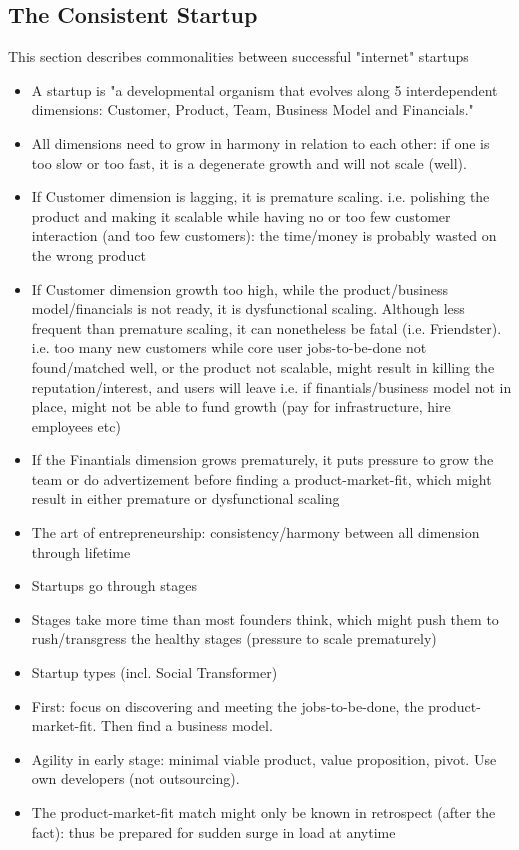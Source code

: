 \documentclass[a4paper,10pt]{article}
\begin{document}
\subsection{The Consistent Startup}
This section describes commonalities between successful "internet" startups
\begin{itemize}
  \item A startup is "a developmental organism that evolves along 5 interdependent dimensions: Customer, Product, Team, Business Model and Financials." \cite{genomePrematureScalingReport}
  \item All dimensions need to grow in harmony in relation to each other: if one is too slow or too fast, it is a degenerate growth and will not scale (well).
  \item If Customer dimension is lagging, it is premature scaling. 
  \subitem i.e. polishing the product and making it scalable while having no or too few customer interaction (and too few customers): the time/money is probably wasted on the wrong product
  \item If Customer dimension growth too high, while the product/business model/financials is not ready, it is dysfunctional scaling. 
	Although less frequent than premature scaling, it can nonetheless be fatal (i.e. Friendster).
  \subitem i.e. too many new customers while core user jobs-to-be-done not found/matched well, or the product not scalable, might result in killing the reputation/interest, and users will leave
  \subitem i.e. if finantials/business model not in place, might not be able to fund growth (pay for infrastructure, hire employees etc) 
  \item If the Finantials dimension grows prematurely, it puts pressure to grow the team or do advertizement before finding a product-market-fit, 
	which might result in either premature or dysfunctional scaling
  \item The art of entrepreneurship: consistency/harmony between all dimension through lifetime
  \item Startups go through stages
  \item Stages take more time than most founders think, which might push them to rush/transgress the healthy stages (pressure to scale prematurely)
  \item Startup types (incl. Social Transformer)
  \item First: focus on discovering and meeting the jobs-to-be-done, the product-market-fit. Then find a business model.
  \item Agility in early stage: minimal viable product, value proposition, pivot. Use own developers (not outsourcing).
  \item The product-market-fit match might only be known in retrospect (after the fact): thus be prepared for sudden surge in load at anytime
\end{itemize}
\end{document}

